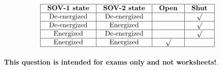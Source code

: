 






$$\vbox{\offinterlineskip
\halign{\strut
\vrule \quad\hfil # \ \hfil & 
\vrule \quad\hfil # \ \hfil & 
\vrule \quad\hfil # \ \hfil & 
\vrule \quad\hfil # \ \hfil \vrule \cr
\noalign{\hrule}
%
{\bf SOV-1 state} & {\bf SOV-2 state} & {\bf Open} & {\bf Shut} \cr
%
\noalign{\hrule}
%
De-energized & De-energized &  & $\surd$ \cr
%
\noalign{\hrule}
%
De-energized & Energized &  & $\surd$ \cr
%
\noalign{\hrule}
%
Energized & De-energized &  & $\surd$ \cr
%
\noalign{\hrule}
%
Energized & Energized & $\surd$ &  \cr
%
\noalign{\hrule}
} %
}$$ %







{\bf This question is intended for exams only and not worksheets!}.



